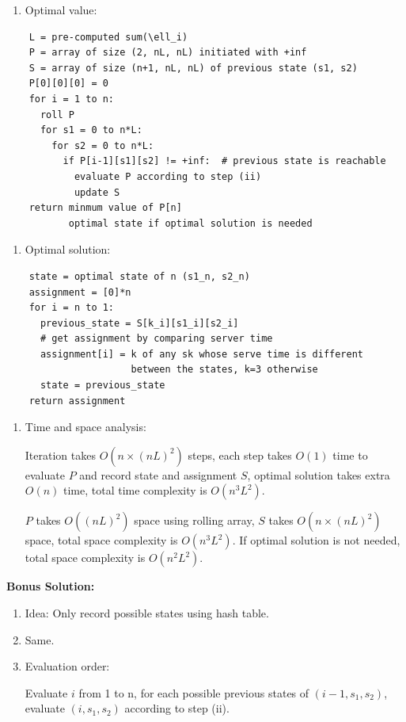 \documentclass[11pt]{article}
\begin{document}
\begin{description}
\begin{enumerate}
  \item[(iv)] Optimal value:
\end{enumerate}
\begin{verbatim}
    L = pre-computed sum(\ell_i)
    P = array of size (2, nL, nL) initiated with +inf
    S = array of size (n+1, nL, nL) of previous state (s1, s2)
    P[0][0][0] = 0
    for i = 1 to n:
      roll P
      for s1 = 0 to n*L:
        for s2 = 0 to n*L:
          if P[i-1][s1][s2] != +inf:  # previous state is reachable
            evaluate P according to step (ii)
            update S
    return minmum value of P[n]
           optimal state if optimal solution is needed
\end{verbatim}
\begin{enumerate}
  \item[(v)] Optimal solution:
\end{enumerate}
\begin{verbatim}
    state = optimal state of n (s1_n, s2_n)
    assignment = [0]*n
    for i = n to 1:
      previous_state = S[k_i][s1_i][s2_i]
      # get assignment by comparing server time
      assignment[i] = k of any sk whose serve time is different 
                      between the states, k=3 otherwise
      state = previous_state
    return assignment
\end{verbatim}
\begin{enumerate}
  \item[(vi)] Time and space analysis:
  
  Iteration takes $O(n \times (nL)^2)$ steps, each step takes $O(1)$ time to evaluate $P$
  and record state and assignment $S$, optimal solution takes extra $O(n)$ time, total time complexity 
  is $O(n^3L^2)$.

  $P$ takes $O((nL)^2)$ space using rolling array, $S$ takes $O(n\times(nL)^2)$ space, total space 
  complexity is $O(n^3L^2)$. If optimal solution is not needed, total space complexity is $O(n^2L^2)$.
\end{enumerate}

\medskip
\textbf{Bonus Solution:}
\begin{enumerate}
  \item[] Idea: Only record possible states using hash table.
  \item[(i\&ii)] Same.
  \item[(iii)] Evaluation order:

  Evaluate $i$ from 1 to n, for each possible previous states of $(i-1, s_1, s_2)$, evaluate
  $(i, s_1, s_2)$ according to step (ii).


\end{enumerate}
\end{description}
\end{document}
